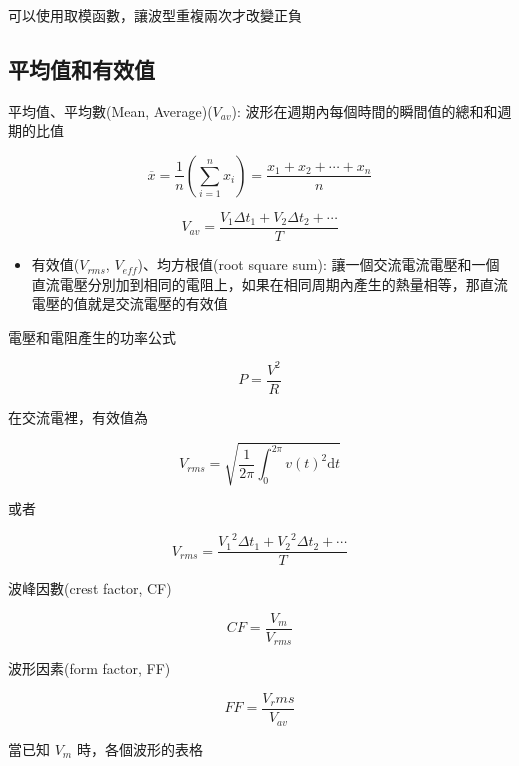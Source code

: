 \documentclass[
]{report}
\providecommand{\tightlist}{%
  \setlength{\itemsep}{0pt}\setlength{\parskip}{0pt}}
\begin{document}
可以使用取模函數，讓波型重複兩次才改變正負


\hypertarget{ux5e73ux5747ux503cux548cux6709ux6548ux503c}{%
\subsection{平均值和有效值}\label{ux5e73ux5747ux503cux548cux6709ux6548ux503c}}

平均值、平均數(Mean, Average)(\(V_{av}\)):
波形在週期內每個時間的瞬間值的總和和週期的比值

\[
{\overline {x}}={\frac {1}{n}}\left(\sum _{i=1}^{n}{x_{i}}\right)={\frac {x_{1}+x_{2}+\cdots +x_{n}}{n}}
\]

\[
V_{av} = \frac{V_1 \Delta t_1 + V_2 \Delta t_2 + \cdots}{T}
\]

\begin{itemize}
\tightlist
\item
  有效值(\(V_{rms}\), \(V_{eff}\))、均方根值(root square sum):
  讓一個交流電流電壓和一個直流電壓分別加到相同的電阻上，如果在相同周期內產生的熱量相等，那直流電壓的值就是交流電壓的有效值
\end{itemize}

電壓和電阻產生的功率公式

\[
P = \frac{V^2}{R}
\]

在交流電裡，有效值為

\[
V_{rms} = \sqrt{\frac{1}{2\pi}\int_{0}^{2\pi} v(t)^2  \mathrm{d}t}
\]

或者

\[
V_{rms} = \frac{{V_1}^2 \Delta t_1 + {V_2}^2 \Delta t_2 + \cdots}{T}
\]

波峰因數(crest factor, CF)

\[
CF = \frac{V_m}{V_{rms}}
\]

波形因素(form factor, FF)

\[
FF = \frac{V_rms}{V_{av}}
\]

當已知 \(V_m\) 時，各個波形的表格
\end{document}
